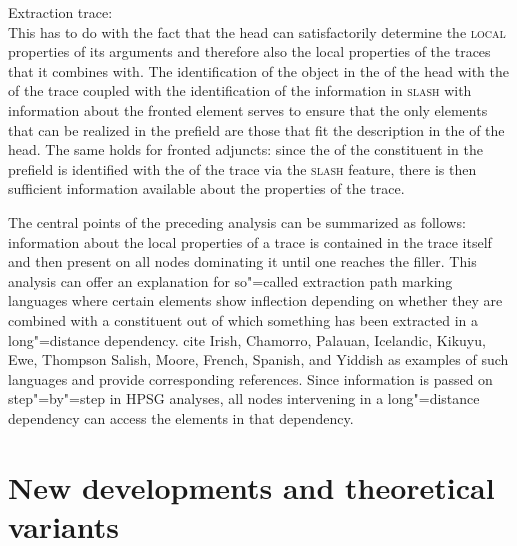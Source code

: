 \eas
\label{le-extraktionsspur}
Extraction trace: \\
\zs
This has to do with the fact that the head can satisfactorily determine the \textsc{local} properties of its arguments and therefore also the
local properties of the traces that it combines with. The identification of the object in the \compsl of the head with the \synsemv of the trace 
coupled with the identification of the information in \textsc{slash} with information about the fronted element serves to ensure that the only elements
that can be realized in the prefield are those that fit the description in the \compsl of the head. The same holds for fronted adjuncts: since the \localv of the constituent 
in the prefield is identified with the \localv of the trace via the \textsc{slash} feature, there is then sufficient information available about the properties
of the trace.

The central points of the preceding analysis can be summarized as follows: information about the local properties of a trace is contained in the trace
itself and then present on all nodes dominating it until one reaches the filler. This analysis can
offer an explanation for so"=called extraction path marking languages where 
certain elements show inflection depending on whether they are combined with a constituent out of which something has been extracted in a long"=distance dependency.
\citet*{BMS2001a} cite\label{page-Irish-complementizers}  Irish,
Chamorro, Palauan, Icelandic, Kikuyu,
Ewe, Thompson Salish, Moore, French, Spanish, and Yiddish as examples of such languages and provide corresponding references.
Since information is passed on step"=by"=step in HPSG analyses, all nodes intervening in a long"=distance dependency can access the elements
in that dependency.%

\section{New developments and theoretical variants}


